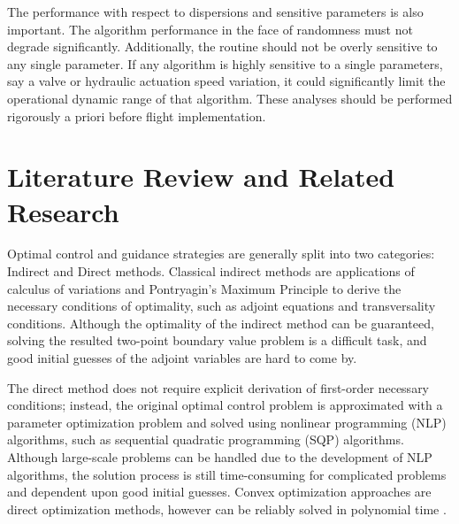 The performance with respect to dispersions and sensitive parameters is also important. The algorithm performance in the face of randomness must not degrade significantly. Additionally, the routine should not be overly sensitive to any single parameter. If any algorithm is highly sensitive to a single parameters, say a valve or hydraulic actuation speed variation, it could significantly limit the operational dynamic range of that algorithm. These analyses should be performed rigorously a priori before flight implementation.



\section{Literature Review and Related Research}
Optimal control and guidance strategies are generally split into two categories: Indirect and Direct methods.
Classical indirect methods are applications of calculus of variations and Pontryagin's Maximum Principle to derive the necessary conditions of optimality, such as adjoint equations and transversality conditions. Although the optimality of the indirect method can be guaranteed, solving the resulted two-point boundary value problem is a difficult task, and good initial guesses of the adjoint variables are hard to come by.

The direct method does not require explicit derivation of first-order necessary conditions; instead, the original optimal control problem is approximated with a parameter optimization problem and solved using nonlinear programming (NLP) algorithms, such as sequential quadratic programming (SQP) algorithms. Although large-scale problems can be handled due to the development of NLP algorithms, the solution process is still time-consuming for complicated problems and dependent upon good initial guesses. Convex optimization approaches are direct optimization methods, however can be reliably solved in polynomial time \cite{nesterov1994interior}.







